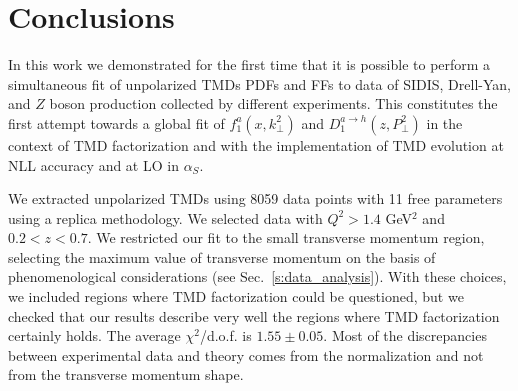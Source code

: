 \documentclass[aps,preprintnumbers,showpacs,nofootinbib,superscriptaddress,floatfix]{revtex4}
\begin{document}





\section{Conclusions}
\label{s:conclusions}


In this work we demonstrated for the first time that it is possible 
to perform a
simultaneous fit of unpolarized TMDs PDFs and FFs 
to data of SIDIS, Drell-Yan, and $Z$
boson production collected by different experiments. 
This constitutes the first attempt towards a global fit of 
$f_1^a(x,k_\perp^2)$ and $D_1^{a \to h}(z,P_\perp^2)$ in the context of TMD
factorization and with the implementation of 
TMD evolution at NLL accuracy and at LO in $\alpha_S$.
  
We extracted unpolarized TMDs using 8059 data points with 11 free parameters
using a replica methodology. We selected data with 
$Q^2 > 1.4$ GeV$^2$ and $0.2 < z < 0.7$. We restricted our fit to the small
transverse momentum region, selecting the maximum value of transverse momentum
on the basis of phenomenological considerations
(see Sec.~\ref{s:data_analysis}). With these choices, 
we included regions where TMD
factorization could be questioned, but we checked that our results describe 
very well the regions where TMD factorization certainly holds.  
The average $\chi^2$/d.o.f. is $1.55 \pm 0.05$.
Most of the discrepancies between experimental data and theory comes from the
normalization and not from the transverse momentum shape. 
\end{document}
